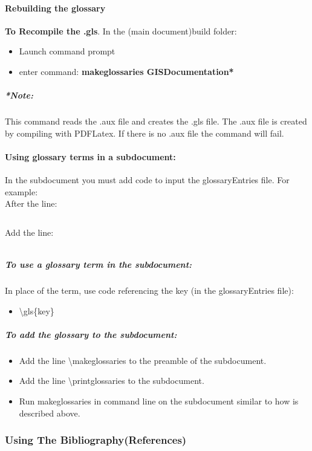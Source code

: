\paragraph{Rebuilding the glossary}
\textbf{To Recompile the .gls}.  In the (main document)build folder:
\begin{itemize}
\item Launch command prompt
\item enter command: \textbf{{\large makeglossaries GISDocumentation*}}
\end{itemize}
\subparagraph*{*Note:} {\footnotesize This command reads the .aux file and creates the .gls file.  The .aux file is created by compiling with PDFLatex.  If there is no .aux file the command will fail.}
\paragraph{Using glossary terms in a subdocument:}
In the subdocument you must add code to input the glossaryEntries file.  For example:\\
After the line:
\begin{verbatim}

\end{verbatim}
Add the line:
\begin{verbatim}

\end{verbatim}
\subparagraph[To use a glossary term]{To use a glossary term in the subdocument:\texorpdfstring{\\}{}}
In place of the term, use code referencing the key (in the glossaryEntries file):
\begin{itemize}
\item \textbackslash gls\{key\}
\end{itemize}
\subparagraph{To add the glossary to the subdocument:}
\begin{itemize}
\item Add the line \textbackslash makeglossaries to the preamble of the subdocument.
\item Add the line \textbackslash printglossaries to the subdocument.
\item Run makeglossaries in command line on the subdocument similar to how is described above.
\end{itemize}


\subsubsection[Using The Bibliography(References)]{{\Large Using The Bibliography(References)}}
